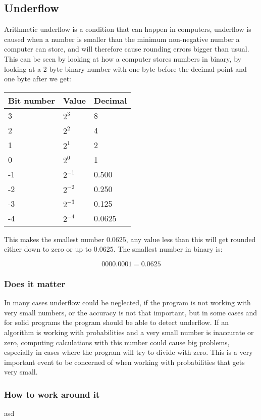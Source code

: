 \subsection{Underflow}
    Arithmetic underflow is a condition that can happen in computers, underflow is caused when a number is smaller than the minimum non-negative number a computer can store, and will therefore cause rounding errors bigger than usual. This can be seen by looking at how a computer stores numbers in binary, by looking at a 2 byte binary number with one byte before the decimal point and one byte after we get:\\

\begin{table}[!h]
    \begin{tabular}{|l|l|l|}
        \hline
        Bit number & Value    & Decimal \\ \hline
        3          & $2^3$    & 8       \\ 
        2          & $2^2$    & 4       \\ 
        1          & $2^1$    & 2       \\ 
        0          & $2^0$    & 1       \\ 
        -1         & $2^{-1}$ & 0.500   \\ 
        -2         & $2^{-2}$ & 0.250   \\ 
        -3         & $2^{-3}$ & 0.125   \\ 
        -4         & $2^{-4}$ & 0.0625  \\
        \hline
    \end{tabular}
\end{table}

    This makes the smallest number $0.0625$, any value less than this will get rounded either down to zero or up to $0.0625$. The smallest number in binary is:

    $$0000.0001 = 0.0625$$

\subsubsection{Does it matter}
In many cases underflow could be neglected, if the program is not working with very small numbers, or the accuracy is not that important, but in some cases and for solid programs the program should be able to detect underflow. If an algorithm is working with probabilities and a very small number is inaccurate or zero, computing calculations with this number could cause big problems, especially in cases where the program will try to divide with zero. This is a very important event to be concerned of when working with probabilities that gets very small.  

\subsubsection{How to work around it}
asd
